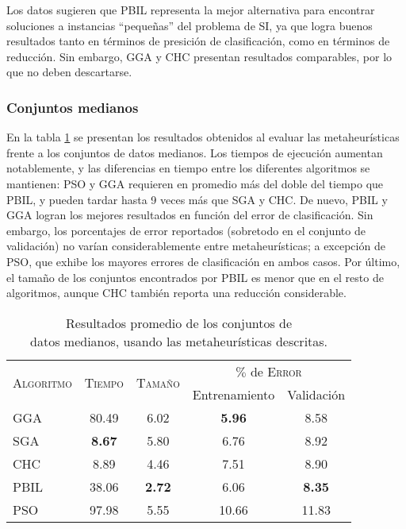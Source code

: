 Los datos sugieren que PBIL representa la mejor alternativa para encontrar soluciones a instancias ``pequeñas'' del problema de SI, ya que logra buenos resultados tanto en términos de presición de clasificación, como en términos de reducción. Sin embargo, GGA y CHC presentan resultados comparables, por lo que no deben descartarse.

\subsubsection{Conjuntos medianos}

En la tabla \ref{res-med} se presentan los resultados obtenidos al evaluar las metaheurísticas frente a los conjuntos de datos medianos. Los tiempos de ejecución aumentan notablemente, y las diferencias en tiempo entre los diferentes algoritmos se mantienen: PSO y GGA requieren en promedio más del doble del tiempo que PBIL, y pueden tardar hasta 9 veces más que SGA y CHC. De nuevo, PBIL y GGA logran los mejores resultados en función del error de clasificación. Sin embargo, los porcentajes de error reportados (sobretodo en el conjunto de validación) no varían considerablemente entre metaheurísticas; a excepción de PSO, que exhibe los mayores errores de clasificación en ambos casos. Por último, el tamaño de los conjuntos encontrados por PBIL es menor que en el resto de algoritmos, aunque CHC también reporta una reducción considerable.

\begin{table}[h!]
\centering
\begin{tabular}{l c c c c}
\hline
\multirow{2}{*}{\textsc{Algoritmo}}
	& \multirow{2}{*}{\textsc{Tiempo}}
	& \multirow{2}{*}{\textsc{Tamaño}}
	& \multicolumn{2}{c}{$\%$ de \textsc{Error}} \\\cline{4-5}
 & & & \scriptsize{Entrenamiento} & \scriptsize{Validación} \\
\hline
\hline
GGA  & 80.49 & 6.02 &  \textbf{5.96} &  8.58 \\
SGA  & \textbf{8.67} & 5.80 &  6.76 &  8.92 \\
CHC  &  8.89 & 4.46 &  7.51 &  8.90 \\
PBIL & 38.06 & \textbf{2.72} &  6.06 &  \textbf{8.35} \\
PSO  & 97.98 & 5.55 & 10.66 & 11.83 \\
\hline
\end{tabular}
\caption[Resultados de metaheurísticas usando conjuntos de datos medianos]{Resultados promedio de los conjuntos de\\datos medianos, usando las metaheurísticas descritas.}
\label{res-med}
\end{table}

